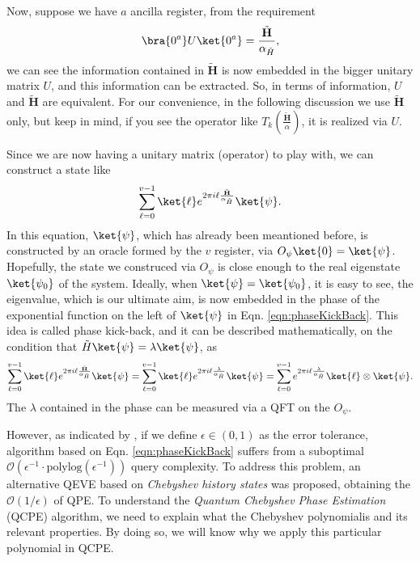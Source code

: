 Now, suppose we have $a$ ancilla register, from the requirement 
\begin{equation}
    \bra{0^a}U\ket{0^a}=\frac{\tilde{\textbf{H}}}{\alpha_{\tilde{H}}},
\end{equation}
we can see the information contained in $\tilde{\textbf{H}}$ is now embedded in the bigger unitary matrix $U$, and this information can be extracted. So, in terms of information, $U$ and $\tilde{\textbf{H}}$ are equivalent. For our convenience, in the following discussion we use $\tilde{\textbf{H}}$ only, but keep in mind, if you see the operator like $T_k(\frac{\tilde{\textbf{H}}}{\alpha})$, it is realized via $U$. 

Since we are now having a unitary matrix (operator) to play with, we can construct a state like
\begin{equation}
    \sum_{\ell=0}^{v-1}\ket{\ell}e^{2\pi i\ell \frac{\tilde{\textbf{H}}}{\alpha_{\tilde{H}}}}\ket{\psi}.
    \label{eqn:phaseKickBack}
\end{equation}
In this equation, $\ket{\psi}$, which has already been meantioned before, is constructed by an oracle formed by the $v$ register, via $O_{\psi}\ket{0}=\ket{\psi}$. Hopefully, the state we construced via $O_{\psi}$ is close enough to the real eigenstate $\ket{\psi_0}$ of the system. Ideally, when $\ket{\psi}=\ket{\psi_0}$, it is easy to see, the eigenvalue, which is our ultimate aim, is now embedded in the phase of the exponential function on the left of $\ket{\psi}$ in Eqn. \ref{eqn:phaseKickBack}. This idea is called phase kick-back, and it can be described mathematically, on the condition that $\tilde{H}\ket{\psi}=\lambda\ket{\psi}$,  as
\begin{equation}
    \sum_{\ell=0}^{v-1}\ket{\ell}e^{2\pi i\ell \frac{\tilde{\textbf{H}}}{\alpha_{\tilde{H}}}}\ket{\psi}=\sum_{\ell=0}^{v-1}\ket{\ell}e^{2\pi i\ell \frac{\lambda}{\alpha_{\tilde{H}}}}\ket{\psi}=\sum_{\ell=0}^{v-1}e^{2\pi i\ell \frac{\lambda}{\alpha_{\tilde{H}}}}\ket{\ell}\otimes\ket{\psi}.
    \label{eqn:phaseKickBack2}
\end{equation}
The $\lambda$ contained in the phase can be measured via a QFT on the $O_{\psi}$. 

However, as indicated by \cite{shao2020eigenvalue}, if we define $\epsilon\in(0,1)$ as the error tolerance, algorithm based on Eqn. \ref{eqn:phaseKickBack} suffers from a suboptimal $\mathcal{O}(\epsilon^{-1}\cdot\text{polylog}(\epsilon^{-1}))$ query complexity. To address this problem, an alternative QEVE based on \textit{Chebyshev history states} was proposed, obtaining the $\mathcal{O}(1/\epsilon)$ of QPE. To understand the \textit{Quantum Chebyshev Phase Estimation} (QCPE) algorithm, we need to explain what the Chebyshev polynomialis  and its relevant properties. By doing so, we will know why we apply this particular polynomial in QCPE. 

